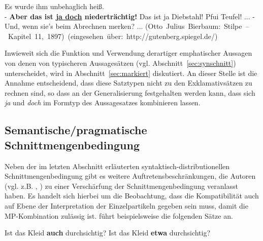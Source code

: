 \begin{exe}
	\ex\label{313} 
	\scriptsize
	Es wurde ihm unbehaglich heiß.\\
	- \textbf{Aber das ist \underline{ja doch} niederträchtig!} Das ist ja Diebstahl! Pfui Teufel! ...
	- Und, wenn sie's beim Abrechnen merken? ...
	\newline
	\hbox{}\hfill\hbox{(Otto Julius Bierbaum: Stilpe – Kapitel 11, 1897) (eingesehen über: http://gutenberg.spiegel.de/)}	
\end{exe}								                       
Inwieweit sich die Funktion und Verwendung derartiger emphatischer Aussagen von denen von typischeren Aussagesätzen (vgl. Abschnitt~\ref{sec:synschnitt}) unterscheidet, wird in Abschnitt~\ref{sec:markiert} diskutiert. An dieser Stelle ist die Annahme entscheidend, dass diese Satztypen nicht zu den Exklamativsätzen zu rechnen sind, so dass an der Generalisierung festgehalten werden kann, dass sich \textit{ja} und \textit{doch} im Formtyp des Aussagesatzes kombinieren lassen.

\subsection{Semantische/pragmatische Schnittmengenbedingung}
Neben der im letzten Abschnitt erläuterten syntaktisch-distributionellen Schnitt\-mengenbedingung gibt es weitere Auftretensbeschränkungen, die Autoren (vgl. z.B. \citealt[218, 222-223]{Dahl1988}, \citealt[25-31]{Thurmair1991}) zu einer Verschärfung der Schnittmengenbedingung veranlasst haben. Es handelt sich hierbei um die Beobachtung, dass die Kompatibilität auch auf Ebene der Interpretation der Einzelpartikeln gegeben sein muss, damit die MP-Kombination zulässig ist. \citet[26-27]{Thurmair1991} führt beispielsweise die folgenden Sätze an.	 

\begin{exe}
	\ex\label{314} 
		\begin{xlist}	
			\ex\label{314a} Ist das Kleid \textbf{auch} durchsichtig?
			\ex\label{314b} Ist das Kleid \textbf{etwa} durchsichtig?
		\end{xlist}
\end{exe}

